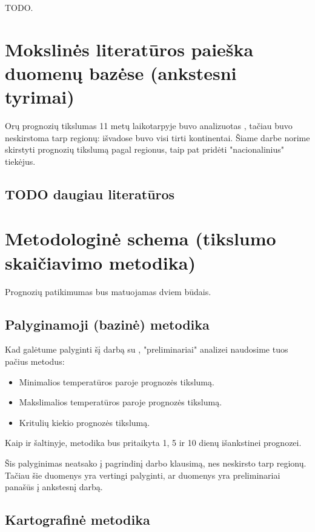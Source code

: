 \documentclass{article}
\begin{document}
TODO.

\section{Mokslinės literatūros paieška duomenų bazėse (ankstesni tyrimai)}

Orų prognozių tikslumas 11 metų laikotarpyje buvo analizuotas
\cite{rose2017analysis}, tačiau buvo neskirstoma tarp regionų: išvadose buvo
visi tirti kontinentai. Šiame darbe norime skirstyti prognozių tikslumą pagal
regionus, taip pat pridėti "nacionalinius" tiekėjus.

\subsection{TODO daugiau literatūros}

\section{Metodologinė schema (tikslumo skaičiavimo metodika)}

Prognozių patikimumas bus matuojamas dviem būdais.

\subsection{Palyginamoji (bazinė) metodika}

Kad galėtume palyginti šį darbą su \cite{rose2017analysis}, "preliminariai"
analizei naudosime tuos pačius metodus:

\begin{itemize}
    \item Minimalios temperatūros paroje prognozės tikslumą.
    \item Makslimalios temperatūros paroje prognozės tikslumą.
    \item Kritulių kiekio prognozės tikslumą.
\end{itemize}

Kaip ir šaltinyje, metodika bus pritaikyta 1, 5 ir 10 dienų išankstinei
prognozei.

Šis palyginimas neatsako į pagrindinį darbo klausimą, nes neskirsto tarp
regionų. Tačiau šie duomenys yra vertingi palyginti, ar duomenys yra preliminariai
panašūs į ankstesnį darbą.

\subsection{Kartografinė metodika}
\end{document}
